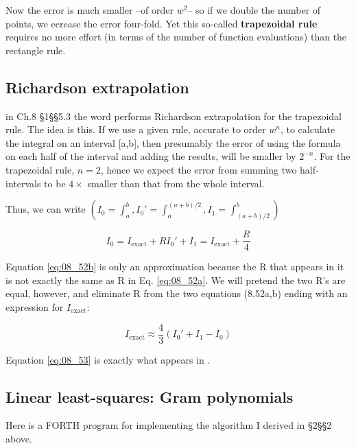 Now the error is much smaller --of order $w^{2}$-- so if we double the number of points, we ecrease the error four-fold. Yet this so-called \textbf{trapezoidal rule} requires no more effort (in terms of the number of function evaluations) than the rectangle rule.


\subsection{Richardson extrapolation}
  in Ch.8 \S1\S\S5.3 the word  performs Richardson extrapolation for the trapezoidal rule. The idea is this. If we use a given rule, accurate to order $w^{n}$, to calculate the integral on an interval [a,b], then presumably the error of using the formula on each half of the interval and adding the results, will be smaller by $2^{-n}$. For the trapezoidal rule, $n = 2$, hence we expect the error from summing two half-intervals to be $4\times$ smaller than that from the whole interval.

Thus, we can write $(I_{0} = \int_{a}^{b} , I_{0}' = \int_{a}^{(a+b)/2}, I_{1} = \int_{(a+b)/2}^{b})$

\begin{subequations}
    \begin{equation}\label{eq:08_52a}
        I_{0} = I_{\text{exact}} + R
    \end{equation}
    \begin{equation}\label{eq:08_52b}
        I_{0}' + I_{1} = I_{\text{exact}} + \frac{R}{4}
    \end{equation}
\end{subequations}

Equation \ref{eq:08_52b} is only an approximation because the R that appears in it is not exactly the same as R in Eq. \ref{eq:08_52a}. We will pretend the two R’s are equal, however, and eliminate R from the two equations (8.52a,b) ending with an expression for $I_{\text{exact}}$:

\begin{equation}\label{eq:08_53}
    I_{\text{exact}} \approx \frac{4}{3}(I_{0}' + I_{1} - I_{0})
\end{equation}

Equation \ref{eq:08_53} is exactly what appears in .


\subsection{Linear least-squares: Gram polynomials}
Here is a FORTH program for implementing the algorithm
I derived in \S2\S\S2 above.


